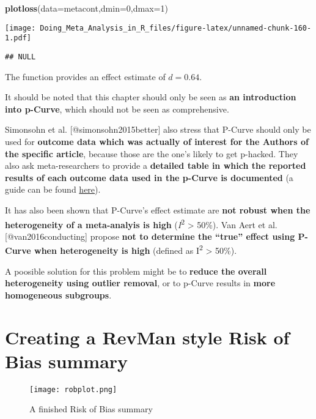 \documentclass[]{book}
\newenvironment{Shaded}{\begin{snugshade}}{\end{snugshade}}
\newcommand{\KeywordTok}[1]{\textcolor[rgb]{0.13,0.29,0.53}{\textbf{#1}}}
\newcommand{\DataTypeTok}[1]{\textcolor[rgb]{0.13,0.29,0.53}{#1}}
\newcommand{\DecValTok}[1]{\textcolor[rgb]{0.00,0.00,0.81}{#1}}
\newcommand{\NormalTok}[1]{#1}
\theoremstyle{definition}
\theoremstyle{definition}
\theoremstyle{definition}
\theoremstyle{remark}
\begin{document}
\begin{Shaded}
\begin{Highlighting}[]
\KeywordTok{plotloss}\NormalTok{(}\DataTypeTok{data=}\NormalTok{metacont,}\DataTypeTok{dmin=}\DecValTok{0}\NormalTok{,}\DataTypeTok{dmax=}\DecValTok{1}\NormalTok{)}
\end{Highlighting}
\end{Shaded}

\texttt{[image: Doing\_Meta\_Analysis\_in\_R\_files/figure-latex/unnamed-chunk-160-1.pdf]}

\begin{verbatim}
## NULL
\end{verbatim}

The function provides an effect estimate of \(d=0.64\).

\begin{rmdachtung}
It should be noted that this chapter should only be seen as \textbf{an
introduction into p-Curve}, which should not be seen as comprehensive.

Simonsohn et al. {[}@simonsohn2015better{]} also stress that P-Curve
should only be used for \textbf{outcome data which was actually of
interest for the Authors of the specific article}, because those are the
one's likely to get p-hacked. They also ask meta-researchers to provide
a \textbf{detailed table in which the reported results of each outcome
data used in the p-Curve is documented} (a guide can be found
\href{http://p-curve.com/guide.pdf}{here}).

It has also been shown that P-Curve's effect estimate are \textbf{not
robust when the heterogeneity of a meta-analyis is high}
(\emph{I}\textsuperscript{2} \textgreater{} 50\%). Van Aert et al.
{[}@van2016conducting{]} propose \textbf{not to determine the ``true''
effect using P-Curve when heterogeneity is high} (defined as
I\textsuperscript{2} \textgreater{} 50\%).

A poosible solution for this problem might be to \textbf{reduce the
overall heterogeneity using outlier removal}, or to p-Curve results in
\textbf{more homogeneous subgroups}.
\end{rmdachtung}

\chapter{Creating a RevMan style Risk of Bias
summary}\label{creating-a-revman-style-risk-of-bias-summary}

\begin{figure}
\centering
\texttt{[image: robplot.png]}
\caption{A finished Risk of Bias summary}
\end{figure}
\end{document}
